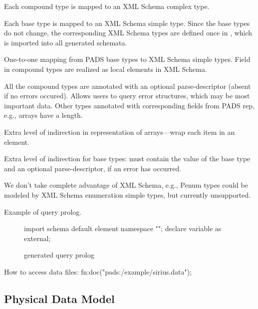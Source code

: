 Each compound type is mapped to an XML Schema complex type.

Each base type is mapped to an XML Schema simple type.  Since the base
types do not change, the corresponding XML Schema types are defined
once in , which is imported into all generated schemata. 

  One-to-one mapping
from PADS base types to XML Schema simple types.  Field in compound
types are realized as local elements in XML Schema. 

All the compound types are annotated with an optional parse-descriptor
(absent if no errors occured).  Allows users to query error
structures, which may be most important data.  Other types annotated
with corresponding fields from PADS rep, e.g., arrays have a length. 

Extra level of indirection in representation of arrays---wrap each
item in an element. 

Extra level of indirection for base types: must contain the value of
the base type and an optional parse-descriptor, if an error has
occurred. 

We don't take complete advantage of XML Schema, e.g., Penum types
could be modeled by XML Schema enumeration simple types, but currently
unsupported.

Example of query prolog. 
\begin{figure*}
\begin{small}
\begin{code}
import schema default element namespace "";
declare variable  as  external; 
\end{code}
\end{small}
\caption{\padx{} generated query prolog}
\label{figure:padx-query-prolog}
\end{figure*}

How to access data files:  fn:doc("pads:/example/sirius.data");

\subsection{Physical Data Model}



